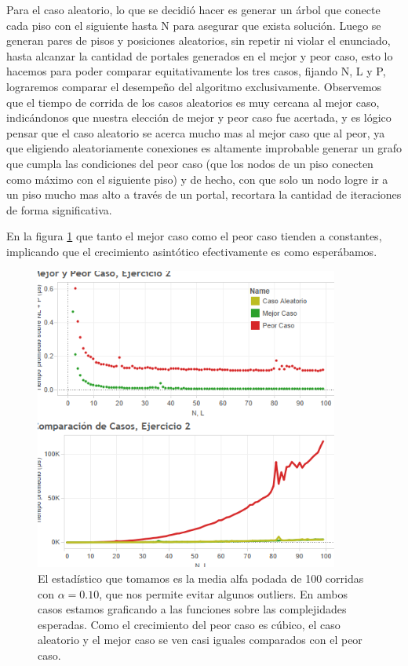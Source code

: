 \documentclass{article}
\theoremstyle{definition}
\theoremstyle{remark}
\begin{document}
Para el caso aleatorio, lo que se decidió hacer es generar un árbol que conecte cada piso con el siguiente hasta N para asegurar que exista solución. Luego se generan pares de pisos y posiciones aleatorios, sin repetir ni violar el enunciado, hasta alcanzar la cantidad de portales generados en el mejor y peor caso, esto lo hacemos para poder comparar equitativamente los tres casos, fijando N, L y P, lograremos comparar el desempeño del algoritmo exclusivamente.
Observemos que el tiempo de corrida de los casos aleatorios es muy cercana al mejor caso, indicándonos que nuestra elección de mejor y peor caso fue acertada, y es lógico pensar que el caso aleatorio se acerca mucho mas al mejor caso que al peor, ya que eligiendo aleatoriamente conexiones es altamente improbable generar un grafo que cumpla las condiciones del peor caso (que los nodos de un piso conecten como máximo con el siguiente piso) y de hecho, con que solo un nodo logre ir a un piso mucho mas alto a través de un portal, recortara la cantidad de iteraciones de forma significativa.

En la figura \ref{grf:ex2} que tanto el mejor caso como el peor caso tienden a constantes, implicando que el crecimiento asintótico efectivamente es como esperábamos.

\begin{figure}
\centering
\centerline{\includegraphics[width=10cm]{ex2}}
\caption{El estadístico que tomamos es la media alfa podada de 100 corridas con $\alpha = 0.10$, que nos permite evitar algunos outliers. En ambos casos estamos graficando a las funciones sobre las complejidades esperadas. Como el crecimiento del peor caso es cúbico, el caso aleatorio y el mejor caso se ven casi iguales comparados con el peor caso.\label{grf:ex2}}
\end{figure}
\end{document}
